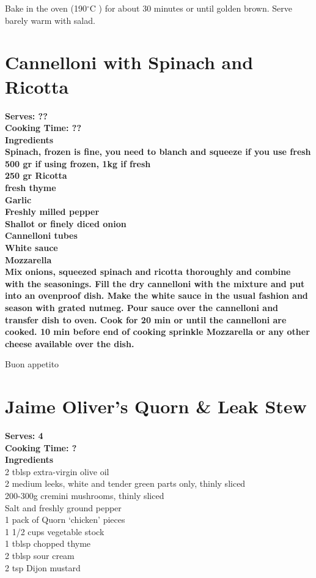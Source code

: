 \documentclass[18pt, oneside]{book}
\begin{document}
Bake in the oven (190$^\circ$C ) for about 30 minutes or until golden brown. Serve barely warm with salad.

\section{Cannelloni with Spinach and Ricotta}
\bf{Serves: ??} \\
\bf{Cooking Time: ??} \\

\bf{Ingredients} \normalfont \\ 
Spinach, frozen is fine, you need to blanch and squeeze if you use fresh \\
500 gr if using frozen, 1kg if fresh \\
250 gr Ricotta \\
fresh thyme \\
Garlic \\
Freshly milled pepper \\
Shallot or finely diced onion \\
Cannelloni tubes \\
White sauce \\
Mozzarella \\

Mix onions, squeezed spinach and ricotta thoroughly and combine with the seasonings. Fill the dry cannelloni with the mixture and put into an ovenproof dish. Make the white sauce in the usual fashion and season with grated nutmeg. Pour sauce over the cannelloni and transfer dish to oven. Cook for 20 min or until the cannelloni are cooked. 10 min before end of cooking sprinkle Mozzarella or any other cheese available over the dish.

Buon appetito


\section{Jaime Oliver's Quorn \& Leak Stew}
\label{vegversion}


\textbf{Serves: 4} \\
\textbf{Cooking Time: ?} \\ 

\textbf{Ingredients}\\ 
2 tblsp extra-virgin olive oil \\
2 medium leeks, white and tender green parts only, thinly sliced \\
200-300g cremini mushrooms, thinly sliced \\
Salt and freshly ground pepper \\
1 pack of Quorn `chicken' pieces \\
1 1/2 cups vegetable stock \\
1 tblsp chopped thyme \\ 
2 tblsp sour cream \\
2 tsp Dijon mustard \\
\end{document}
